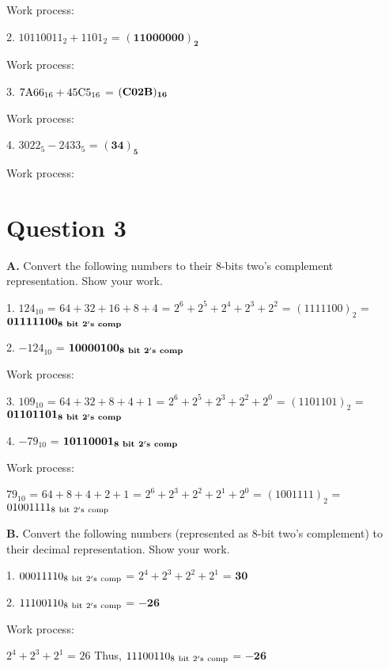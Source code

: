 \documentclass[11pt]{article}
\begin{document}
	Work process: 
	\vspace{30mm}

	2. $10110011_2+1101_2$ = $\mathbf{(11000000)_2}$
	
	Work process: 
	\vspace{30mm}	

	3. $7{\rm A}66_{16}+45{\rm C}5_{16}$ = $\mathbf{(C02\rm \mathbf{B)_{16}}}$

	Work process: 
	\vspace{30mm}
	
	4. $3022_5-2433_5$ = $\mathbf{(34)_5}$
	
	Work process: 
	\vspace{30mm}
	
	\newpage
	\section*{Question 3}
	\textbf{A.} Convert the following numbers to their 8-bits two's complement representation. Show your work.
	\medskip
	
	1. $124_{10}$ = $64+32+16+8+4$ = $2^6+2^5+2^4+2^3+2^2$ = $(1111100)_2$ =  $\mathbf{01111100_{\rm \mathbf{8\ bit\ 2's\ comp}}}$
	
	2. $-124_{10}$ = $\mathbf{10000100_{\rm \mathbf{8\ bit\ 2's\ comp}}}$

	Work process: 
	\vspace{30mm}
	
	3. $109_{10}$ = $64+32+8+4+1$ = $2^6+2^5+2^3+2^2+2^0$ = $(1101101)_2$ = $\mathbf{01101101_{\rm \mathbf{8\ bit\ 2's\ comp}}}$

	
	4. $-79_{10}$ = $\mathbf{10110001_{\rm \mathbf{8\ bit\ 2's\ comp}}}$

	Work process: 
	
	$79_{10}$ = $64+8+4+2+1$ = $2^6+2^3+2^2+2^1+2^0$ = $(1001111)_2$ = $01001111_{\rm 8\ bit\ 2's\ comp}$
	\vspace{25mm}

	\vspace{3mm}
	\textbf{B.} Convert the following numbers (represented as 8-bit two's complement) to their decimal representation. Show your work.
	\medskip
	
	1. $00011110_{\rm 8\ bit\ 2's\ comp}$ = $2^4+2^3+2^2+2^1$ = $\mathbf{30}$
	
	2. $11100110_{\rm 8\ bit\ 2's\ comp}$ = $\mathbf{-26}$
	
	Work process:
	\vspace{25mm}
	
	$2^4+2^3+2^1$ = $26$\hspace{3mm}
	Thus, $11100110_{\rm 8\ bit\ 2's\ comp}$ = $\mathbf{-26}$
	
\end{document}
